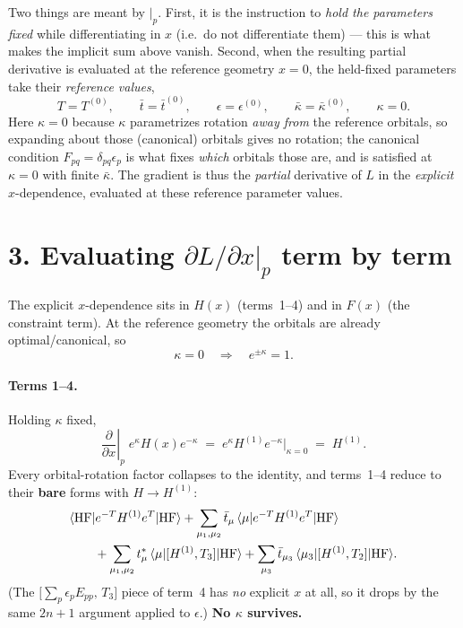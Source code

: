 \documentclass[11pt]{article}
\newcommand{\bra}[1]{\langle #1|}
\newcommand{\ket}[1]{|#1\rangle}
\newcommand{\HF}{\mathrm{HF}}
\newcommand{\pdx}[1]{\left.\frac{\partial #1}{\partial x}\right|_{p}}
\begin{document}
Two things are meant by $\big|_{p}$. First, it is the instruction to \emph{hold the parameters
fixed} while differentiating in $x$ (i.e.\ do not differentiate them) --- this is what makes the
implicit sum above vanish. Second, when the resulting partial derivative is evaluated at the
reference geometry $x=0$, the held-fixed parameters take their \emph{reference values},
\begin{equation}
T = T^{(0)},\qquad \bar t = \bar t^{(0)},\qquad \epsilon = \epsilon^{(0)},\qquad
\bar\kappa = \bar\kappa^{(0)},\qquad \kappa = 0 .
\end{equation}
Here $\kappa=0$ because $\kappa$ parametrizes rotation \emph{away from} the reference orbitals, so
expanding about those (canonical) orbitals gives no rotation; the canonical condition
$F_{pq}=\delta_{pq}\epsilon_p$ is what fixes \emph{which} orbitals those are, and is satisfied at
$\kappa=0$ with finite $\bar\kappa$. The gradient is thus the \emph{partial} derivative of $L$ in
the \emph{explicit} $x$-dependence, evaluated at these reference parameter values.

\section*{3. Evaluating $\partial L/\partial x|_{p}$ term by term}

The explicit $x$-dependence sits in $H(x)$ (terms~1--4) and in $F(x)$ (the constraint term).
At the reference geometry the orbitals are already optimal/canonical, so
\begin{equation}
\kappa = 0 \quad\Longrightarrow\quad e^{\pm\kappa} = 1 .
\end{equation}

\paragraph{Terms 1--4.} Holding $\kappa$ fixed,
\begin{equation}
\pdx{}\; e^{\kappa}H(x)e^{-\kappa}
 \;=\; e^{\kappa} H^{(1)} e^{-\kappa}\Big|_{\kappa=0} \;=\; H^{(1)} .
\end{equation}
Every orbital-rotation factor collapses to the identity, and terms~1--4 reduce to their
\textbf{bare} forms with $H\to H^{(1)}$:
\begin{align}
&\bra{\HF} e^{-T} H^{(1)} e^{T}\ket{\HF}
+ \sum_{\mu_1,\mu_2}\bar t_\mu\, \bra{\mu} e^{-T} H^{(1)} e^{T}\ket{\HF}
\notag\\
&\qquad + \sum_{\mu_1,\mu_2} t^{*}_\mu\, \bra{\mu}[H^{(1)},T_3]\ket{\HF}
+ \sum_{\mu_3}\bar t_{\mu_3}\,\bra{\mu_3}[H^{(1)},T_2]\ket{\HF}.
\end{align}
(The $\big[\sum_p\epsilon_p E_{pp},\,T_3\big]$ piece of term~4 has \emph{no} explicit $x$ at all,
so it drops by the same $2n{+}1$ argument applied to $\epsilon$.) \textbf{No $\kappa$ survives.}
\end{document}
